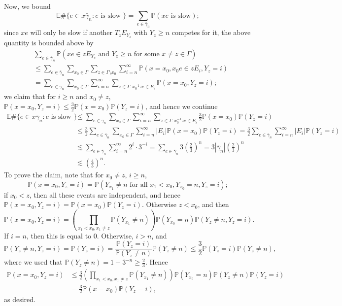 \documentclass[12pt,reqno]{article}
\numberwithin{equation}{section}
\newcommand{\E}{\mathbb{E}}
\newcommand{\Prob}{\mathbb{P}}
\begin{document}
Now, we bound 
\[ \E \#\{e \in x \bar{\gamma}_n : e \mbox{ is slow }\} = \sum_{e \in \bar{\gamma}_n } \Prob( xe \mbox{ is slow} ); \]
since $xe$ will only be slow if another $T_z E_{Y_z}$ with $Y_z \ge n$ competes for it, the above quantity is bounded above by
\begin{align*}
   &\sum_{e \in\bar{\gamma}_n} \Prob(xe \in zE_{Y_z} \mbox{ and } Y_z \ge n \mbox{ for some } x \ne z \in \Gamma) \\
   &\le \sum_{e \in \bar{\gamma}_n}  \sum_{x_0 \in \Gamma} \sum_{z \in \Gamma \setminus x_0} \sum_{i=n}^{\infty}
   \Prob(x=x_0, x_0 e \in z E_i, Y_z = i) \\
   & = \sum_{e \in \bar{\gamma}_n} \sum_{x_0 \in \Gamma} \sum_{i=n}^{\infty} \sum_{z \in \Gamma : x_0^{-1} z e \in E_i} 
   \Prob(x=x_0, Y_z = i); 
\end{align*}
we claim that for $i \ge n$ and $x_0 \ne z$, $\Prob(x=x_0, Y_z=i) \le \frac{3}{2} \Prob(x=x_0) \Prob(Y_z=i)$, and hence we continue
\begin{align}
   \label{eqn:obstructionbound} 
   \E \#\{e \in x \bar{\gamma}_n : e \mbox{ is slow }\} 
   &\le \sum_{e \in \bar{\gamma}_n} \sum_{x_0 \in \Gamma} \sum_{i=n}^{\infty} \sum_{z \in \Gamma : x_0^{-1} z e \in E_i} 
   \frac{3}{2} \Prob(x=x_0) \Prob(Y_z = i) \nonumber \\
   &\le \frac{3}{2}\sum_{e \in \bar{\gamma}_n} \sum_{x_0 \in \Gamma} \sum_{i=n}^{\infty} |E_i| \Prob(x=x_0) \Prob(Y_z=i) 
   = \frac{3}{2} \sum_{e \in \bar{\gamma}_n} \sum_{i=n}^{\infty} |E_i| \Prob(Y_z=i) \nonumber \\
   &\lesssim \sum_{e \in \bar{\gamma}_n} \sum_{i=n}^{\infty} 2^i \cdot 3^{-i}
   = \sum_{e \in \bar{\gamma}_n} 3 \left( \frac{2}{3} \right)^n 
   = 3 |\bar{\gamma}_n| \left( \frac{2}{3} \right)^n \nonumber \\
   &\lesssim \left( \frac{4}{3} \right)^n. 
\end{align}
To prove the claim, note that for $x_0 \ne z$, $i \ge n$,
\[ \Prob(x = x_0, Y_z = i) = \Prob(Y_{x_1} \ne n \mbox{ for all } x_1 < x_0, Y_{x_0} = n, Y_z = i); \]
if $x_0 < z$, then all these events are independent, and hence $\Prob(x=x_0, Y_z=i) = \Prob(x=x_0)\Prob(Y_z=i)$.
Otherwise $z < x_0$, and then
\[ \Prob(x = x_0, Y_z = i) = \left(\prod_{x_1 < x_0, x_1 \ne z} \Prob(Y_{x_1} \ne n) \right) \Prob(Y_{x_0} = n) \Prob( Y_z \ne n, Y_z = i). \]
If $i = n$, then this is equal to $0$. Otherwise, $i>n$, and 
\[
    \Prob(Y_z \ne n, Y_z = i) = \Prob(Y_z = i) = \frac{\Prob(Y_z = i)}{\Prob(Y_z \ne n)} \Prob(Y_z \ne n) \le \frac{3}{2} \Prob(Y_z = i) \Prob(Y_z \ne n),
\]
where we used that $\Prob(Y_z \ne n) = 1 - 3^{-n} \ge \frac{2}{3}$. Hence
\begin{align*}
   \Prob(x=x_0, Y_z = i) 
   &\le \frac{3}{2} \left(\prod_{x_1 < x_0, x_1 \ne z} \Prob(Y_{x_1} \ne n) \right) \Prob(Y_{x_0} = n) \Prob(Y_z \ne n) \Prob(Y_z = i) \\
   &= \frac{3}{2} \Prob(x=x_0) \Prob(Y_z = i),
\end{align*}
as desired.
\end{document}
